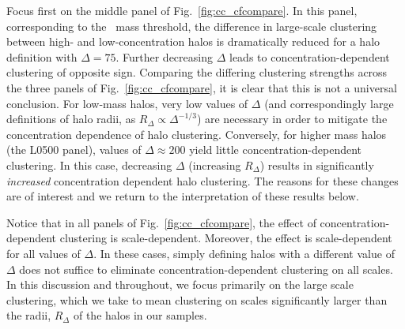 \documentclass[usenatbib]{mnras}
\begin{document}
Focus first on the middle panel of Fig.~\ref{fig:cc_cfcompare}. In this panel, corresponding to the 
\simB~mass threshold, the difference in large-scale clustering between high- and low-concentration halos 
is dramatically reduced for a halo definition with $\Delta=75$. Further decreasing $\Delta$ leads to
concentration-dependent clustering of opposite sign. Comparing the differing clustering 
strengths across the three panels of Fig.~\ref{fig:cc_cfcompare}, it is clear that this is not a universal
conclusion. For low-mass halos, very low values of $\Delta$ (and correspondingly large definitions of halo radii,
as $R_{\Delta} \propto \Delta^{-1/3}$) are necessary in order to mitigate the concentration dependence of halo
clustering. Conversely, for higher
mass halos (the L0500 panel), values of $\Delta \approx 200$ yield little concentration-dependent clustering. In
this case, decreasing $\Delta$ (increasing $R_{\Delta}$) results in significantly {\em increased} concentration
dependent halo clustering. The reasons for these changes are of interest and we return to the interpretation of 
these results below.

Notice that in all panels of Fig.~\ref{fig:cc_cfcompare}, the effect of concentration-dependent clustering is
scale-dependent. Moreover, the effect is scale-dependent for all values of $\Delta$. In these cases, simply
defining halos with a different value of $\Delta$ does not suffice to eliminate concentration-dependent
clustering on all scales. In this discussion and throughout, we focus primarily on the large scale clustering,
which we take to mean clustering on scales significantly larger than the radii, $R_{\Delta}$ of the halos in our
samples.
\end{document}
